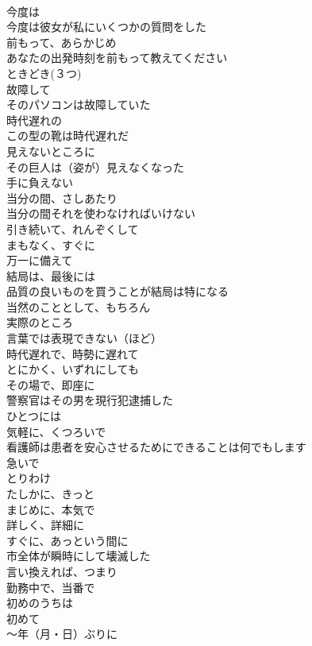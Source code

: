 \documentclass[8pt]{extreport}
\begin{document}
\begin{CJK}{UTF8}{min}
\\	今度は	
\\	今度は彼女が私にいくつかの質問をした
\\	前もって、あらかじめ	
\\	あなたの出発時刻を前もって教えてください
\\	ときどき(３つ)	
\\	故障して	
\\	そのパソコンは故障していた
\\	時代遅れの	
\\	この型の靴は時代遅れだ
\\	見えないところに	
\\	その巨人は（姿が）見えなくなった
\\	手に負えない	
\\	当分の間、さしあたり	
\\	当分の間それを使わなければいけない
\\	引き続いて、れんぞくして	
\\	まもなく、すぐに	
\\	万一に備えて	
\\	結局は、最後には	
\\	品質の良いものを買うことが結局は特になる
\\	当然のこととして、もちろん	
\\	実際のところ	
\\	言葉では表現できない（ほど）	
\\	時代遅れで、時勢に遅れて	
\\	とにかく、いずれにしても	
\\	その場で、即座に	
\\	警察官はその男を現行犯逮捕した
\\	ひとつには	
\\	気軽に、くつろいで	
\\	看護師は患者を安心させるためにできることは何でもします
\\	急いで	
\\	とりわけ	
\\	たしかに、きっと	
\\	まじめに、本気で	
\\	詳しく、詳細に	
\\	すぐに、あっという間に	
\\	市全体が瞬時にして壊滅した
\\	言い換えれば、つまり	
\\	勤務中で、当番で	
\\	初めのうちは	
\\	初めて	
\\	～年（月・日）ぶりに	

\end{CJK}
\end{document}
